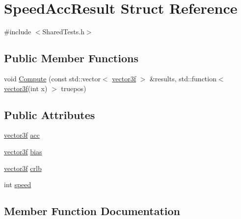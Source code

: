 \hypertarget{struct_speed_acc_result}{}\section{Speed\+Acc\+Result Struct Reference}
\label{struct_speed_acc_result}


{\ttfamily \#include $<$Shared\+Tests.\+h$>$}

\subsection*{Public Member Functions}
\begin{DoxyCompactItemize}
\item 
void \hyperlink{struct_speed_acc_result_a1dcba172a9a9d2974ee41278aeb6e7d6}{Compute} (const std\+::vector$<$ \hyperlink{std__incl_8h_a2feaef1d85a74bd5cf80df91b1a9a914}{vector3f} $>$ \&results, std\+::function$<$ \hyperlink{std__incl_8h_a2feaef1d85a74bd5cf80df91b1a9a914}{vector3f}(int x) $>$ truepos)
\end{DoxyCompactItemize}
\subsection*{Public Attributes}
\begin{DoxyCompactItemize}
\item 
\hyperlink{std__incl_8h_a2feaef1d85a74bd5cf80df91b1a9a914}{vector3f} \hyperlink{struct_speed_acc_result_a3126444f87be7af1cfa4e8667d2074ca}{acc}
\item 
\hyperlink{std__incl_8h_a2feaef1d85a74bd5cf80df91b1a9a914}{vector3f} \hyperlink{struct_speed_acc_result_a5a85287067db300e2205507b8c67cd5a}{bias}
\item 
\hyperlink{std__incl_8h_a2feaef1d85a74bd5cf80df91b1a9a914}{vector3f} \hyperlink{struct_speed_acc_result_aec7bafb1d6f5fa5022115857bbca5094}{crlb}
\item 
int \hyperlink{struct_speed_acc_result_acff2d93f39aef032dfb530636ca78463}{speed}
\end{DoxyCompactItemize}


\subsection{Member Function Documentation}
